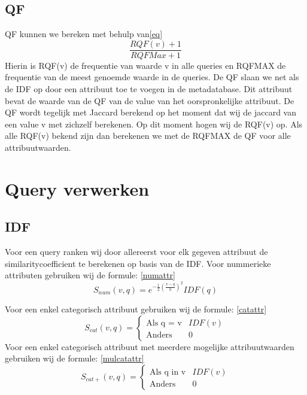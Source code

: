 \documentclass[a4paper]{article}
\begin{document}
\subsection{QF}
QF kunnen we bereken met behulp van\eqref{eq}
\begin{equation}
\frac{RQF(v)+1}{RQFMax+1}
\label{eq}
\end{equation}
Hierin is RQF(v) de frequentie van waarde v in alle queries en RQFMAX de frequentie van de meest genoemde waarde in de queries.
De QF slaan we net als de IDF op door een attribuut toe te voegen in de metadatabase. Dit attribuut bevat de waarde van de QF van de value van het oorspronkelijke attribuut. De QF wordt tegelijk met Jaccard berekend op het moment dat wij de jaccard van een value v met zichzelf berekenen. Op dit moment hogen wij de RQF(v) op.
Als alle RQF(v) bekend zijn dan berekenen we met de RQFMAX de QF voor alle attribuutwaarden.
\section{Query verwerken}
\subsection{IDF}
Voor een query ranken wij door allereerst voor elk gegeven attribuut de similaritycoefficient te berekenen op basis van de IDF.
Voor nummerieke attributen gebruiken wij de formule: \eqref{numattr}
\begin{equation}
S_{num}(v,q) = e^{-\frac{1}{2}(\frac{v-q}{h})^2} IDF(q)
\label{numattr}
\end{equation}

Voor een enkel categorisch attribuut gebruiken wij de formule: \eqref{catattr}
\begin{equation}
S_{cat}(v,q) = \left\{ \begin{matrix}\mbox{Als q = v}  & IDF(v) \\ \mbox{Anders } & 0 \end{matrix}\right.
\label{catattr}
\end{equation}
Voor een enkel categorisch attribuut met meerdere mogelijke attribuutwaarden gebruiken wij de formule: \eqref{mulcatattr}
\begin{equation}
S_{cat+}(v,q) = \left\{ \begin{matrix}\mbox{Als q in v}  & IDF(v) \\ \mbox{Anders } & 0 \end{matrix}\right.
\label{mulcatattr}
\end{equation}
\end{document}
